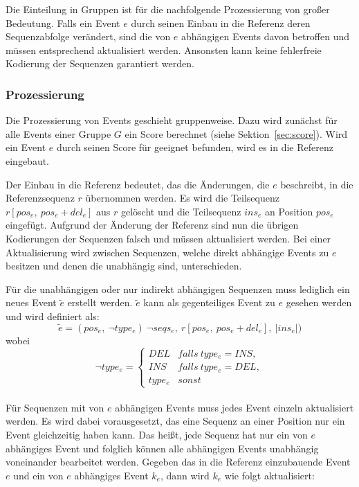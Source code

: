 \documentclass[12pt]{article}
\begin{document}
Die Einteilung in Gruppen ist für die nachfolgende Prozessierung von großer Bedeutung. Falls ein Event $e$ durch seinen Einbau in die Referenz deren Sequenzabfolge verändert, sind die von $e$ abhängigen Events davon betroffen und müssen entsprechend aktualisiert werden. Ansonsten kann keine fehlerfreie Kodierung der Sequenzen garantiert werden.

\subsubsection{Prozessierung}
Die Prozessierung von Events geschieht gruppenweise. Dazu wird zunächst für alle Events einer Gruppe $G$ ein Score berechnet (siehe Sektion~\ref{sec:score}). Wird ein Event $e$ durch seinen Score für geeignet befunden, wird es in die Referenz eingebaut.

Der Einbau in die Referenz bedeutet, das die Änderungen, die $e$ beschreibt, in die Referenzsequenz $r$ übernommen werden. Es wird die Teilsequenz $r[pos_{e},~pos_{e}+del_{e}]$ aus $r$ gelöscht und die Teilsequenz $ins_{e}$ an Position $pos_{e}$ eingefügt. Aufgrund der Änderung der Referenz sind nun die übrigen Kodierungen der Sequenzen falsch und müssen aktualisiert werden. Bei einer Aktualisierung wird zwischen Sequenzen, welche direkt abhängige Events zu $e$ besitzen und denen die unabhängig sind, unterschieden. 

Für die unabhängigen oder nur indirekt abhängigen Sequenzen muss lediglich ein neues Event $\tilde{e}$ erstellt werden. $\tilde{e}$ kann als gegenteiliges Event zu $e$ gesehen werden und wird definiert als:
\begin{equation}
\tilde{e} = (pos_{e},~\neg type_{e})~\neg seqs_{e},~r[pos_{e},~pos_{e}+del_{e}],~|ins_{e}|)
\end{equation}
wobei
\begin{equation}
\neg type_{e} =
\begin{cases}
DEL & falls~ type_{e} = INS, \\
INS & falls~ type_{e} = DEL, \\
type_{e} & sonst
\end{cases}
\end{equation}
\\
Für Sequenzen mit von $e$ abhängigen Events muss jedes Event einzeln aktualisiert werden. Es wird dabei vorausgesetzt, das eine Sequenz an einer Position nur ein Event gleichzeitig haben kann. Das heißt, jede Sequenz hat nur ein von $e$ abhängiges Event und folglich können alle abhängigen Events unabhängig voneinander bearbeitet werden. Gegeben das in die Referenz einzubauende Event $e$ und ein von $e$ abhängiges Event $k_{e}$, dann wird $k_{e}$ wie folgt aktualisiert:
\end{document}
